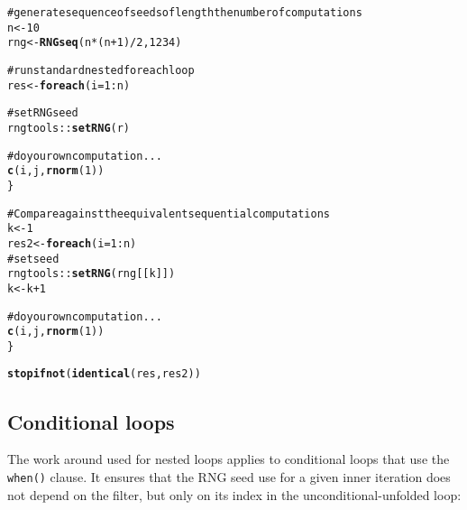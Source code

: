 \documentclass[a4paper,12pt]{article}\usepackage{graphicx, color}
\makeatletter
\newcommand{\hlfunctioncall}[1]{\textcolor[rgb]{0.501960784313725,0,0.329411764705882}{\textbf{#1}}}%
\newcommand{\hlcomment}[1]{\textcolor[rgb]{0.180392156862745,0.6,0.341176470588235}{#1}}%
\newenvironment{kframe}{%
 \def\at@end@of@kframe{}%
 \ifinner\ifhmode%
  \def\at@end@of@kframe{\end{minipage}}%
  \begin{minipage}{\columnwidth}%
 \fi\fi%
 \def\FrameCommand##1{\hskip\@totalleftmargin \hskip-\fboxsep
 \colorbox{shadecolor}{##1}\hskip-\fboxsep
     \hskip-\linewidth \hskip-\@totalleftmargin \hskip\columnwidth}%
 \MakeFramed {\advance\hsize-\width
   \@totalleftmargin\z@ \linewidth\hsize
   \@setminipage}}%
 {\par\unskip\endMakeFramed%
 \at@end@of@kframe}
\newenvironment{knitrout}{}{} %
\renewenvironment{knitrout}{\begin{footnotesize}}{\end{footnotesize}}
\let\code=\texttt
\makeatother
\begin{document}
\begin{knitrout}
\color{fgcolor}\begin{kframe}
\begin{alltt}
\hlcomment{# generate sequence of seeds of length the number of computations}
n <- 10
rng <- \hlfunctioncall{RNGseq}(n * (n + 1)/2, 1234)

\hlcomment{# run standard nested foreach loop}
res <- \hlfunctioncall{foreach}(i = 1:n) %:% \hlfunctioncall{foreach}(j = 1:i, r = rng[(i - 1) * i/2 + 1:i]) %dopar% \{
    
\hlcomment{    # set RNG seed}
    rngtools::\hlfunctioncall{setRNG}(r)
    
\hlcomment{    # do your own computation ...}
    \hlfunctioncall{c}(i, j, \hlfunctioncall{rnorm}(1))
\}

\hlcomment{# Compare against the equivalent sequential computations}
k <- 1
res2 <- \hlfunctioncall{foreach}(i = 1:n) %:% \hlfunctioncall{foreach}(j = 1:i) %do% \{
\hlcomment{    # set seed}
    rngtools::\hlfunctioncall{setRNG}(rng[[k]])
    k <- k + 1
    
\hlcomment{    # do your own computation ...}
    \hlfunctioncall{c}(i, j, \hlfunctioncall{rnorm}(1))
\}

\hlfunctioncall{stopifnot}(\hlfunctioncall{identical}(res, res2))
\end{alltt}
\end{kframe}
\end{knitrout}


\subsection{Conditional loops}
The work around used for nested loops applies to conditional loops that use the \code{when()} 
clause.
It ensures that the RNG seed use for a given inner iteration does not depend on the 
filter, but only on its index in the unconditional-unfolded loop:
\end{document}
